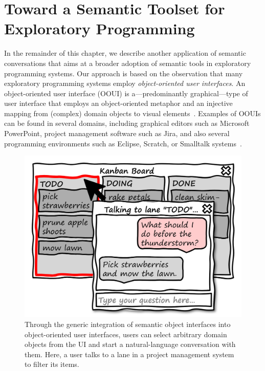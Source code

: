 
\section{Toward a Semantic Toolset for Exploratory Programming}
\label{sec:application/system}

In the remainder of this chapter, we describe another application of semantic conversations that aims at a broader adoption of semantic tools in exploratory programming systems.
Our approach is based on the observation that many exploratory programming systems employ \emph{object-oriented user interfaces}.
An object-oriented user interface (OOUI) is a---predominantly graphical---type of user interface that employs an object-oriented metaphor and an injective mapping from (complex) domain objects to visual elements~\cite{collins1995designing}.
Examples of OOUIs can be found in several domains, including graphical editors such as Microsoft PowerPoint, project management software such as Jira, and also several programming environments such as Eclipse, Scratch, or Smalltalk systems~\cite{pawson2001naked}.

\begin{figure}
	\centering
	\includegraphics[height=12\baselineskip]{chapters/08_application/03_system/project.png}
	\caption[Sketching a generic integration of semantic object interfaces into object-oriented user interfaces.]{
		Through the generic integration of semantic object interfaces into object-oriented user interfaces, users can select arbitrary domain objects from the UI and start a natural-language conversation with them.
		Here, a user talks to a lane in a project management system to filter its items.
	}
	\label{fig:application/system/project}
\end{figure}

